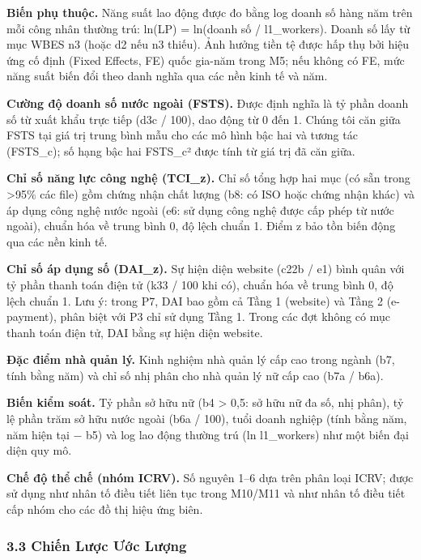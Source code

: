 \documentclass[12pt,a4paper]{article}
\begin{document}
\textbf{Biến phụ thuộc.} Năng suất lao động được đo bằng log doanh số
hàng năm trên mỗi công nhân thường trú: ln(LP) = ln(doanh số /
l1\_workers). Doanh số lấy từ mục WBES n3 (hoặc d2 nếu n3 thiếu). Ảnh
hưởng tiền tệ được hấp thụ bởi hiệu ứng cố định (Fixed Effects, FE) quốc
gia-năm trong M5; nếu không có FE, mức năng suất biến đổi theo danh
nghĩa qua các nền kinh tế và năm.

\textbf{Cường độ doanh số nước ngoài (FSTS).} Được định nghĩa là tỷ phần
doanh số từ xuất khẩu trực tiếp (d3c / 100), dao động từ 0 đến 1. Chúng
tôi căn giữa FSTS tại giá trị trung bình mẫu cho các mô hình bậc hai và
tương tác (FSTS\_c); số hạng bậc hai FSTS\_c² được tính từ giá trị đã
căn giữa.

\textbf{Chỉ số năng lực công nghệ (TCI\_z).} Chỉ số tổng hợp hai mục (có
sẵn trong \textgreater95\% các file) gồm chứng nhận chất lượng (b8: có
ISO hoặc chứng nhận khác) và áp dụng công nghệ nước ngoài (e6: sử dụng
công nghệ được cấp phép từ nước ngoài), chuẩn hóa về trung bình 0, độ
lệch chuẩn 1. Điểm z bảo tồn biến động qua các nền kinh tế.

\textbf{Chỉ số áp dụng số (DAI\_z).} Sự hiện diện website (c22b / e1)
bình quân với tỷ phần thanh toán điện tử (k33 / 100 khi có), chuẩn hóa
về trung bình 0, độ lệch chuẩn 1. Lưu ý: trong P7, DAI bao gồm cả Tầng 1
(website) và Tầng 2 (e-payment), phân biệt với P3 chỉ sử dụng Tầng 1.
Trong các đợt không có mục thanh toán điện tử, DAI bằng sự hiện diện
website.

\textbf{Đặc điểm nhà quản lý.} Kinh nghiệm nhà quản lý cấp cao trong
ngành (b7, tính bằng năm) và chỉ số nhị phân cho nhà quản lý nữ cấp cao
(b7a / b6a).

\textbf{Biến kiểm soát.} Tỷ phần sở hữu nữ (b4 \textgreater{} 0,5: sở
hữu nữ đa số, nhị phân), tỷ lệ phần trăm sở hữu nước ngoài (b6a / 100),
tuổi doanh nghiệp (tính bằng năm, năm hiện tại − b5) và log lao động
thường trú (ln l1\_workers) như một biến đại diện quy mô.

\textbf{Chế độ thể chế (nhóm ICRV).} Số nguyên 1--6 dựa trên phân loại
ICRV; được sử dụng như nhân tố điều tiết liên tục trong M10/M11 và như
nhân tố điều tiết cấp nhóm cho các đồ thị hiệu ứng biên.

\hypertarget{33-chiux1ebfn-lux1b0ux1ee3c-ux1b0ux1edbc-lux1b0ux1ee3ng}{%
\subsubsection{3.3 Chiến Lược Ước
Lượng}\label{33-chiux1ebfn-lux1b0ux1ee3c-ux1b0ux1edbc-lux1b0ux1ee3ng}}
\end{document}
